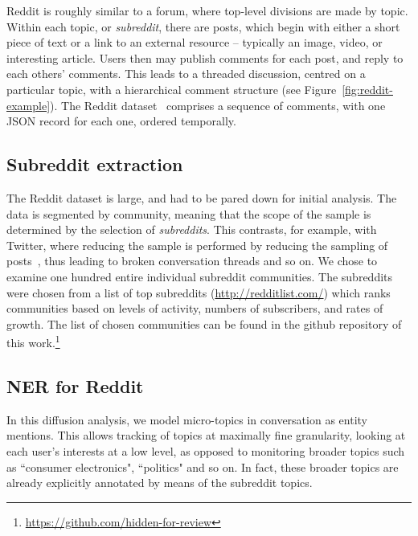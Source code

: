 \documentclass[sigconf]{acmart}
\begin{document}
Reddit is roughly similar to a forum, where top-level divisions are made by topic.
Within each topic, or {\em subreddit}, there are posts, which begin with either a short piece of text or a link to an external resource -- typically an image, video, or interesting article.
Users then may publish comments for each post, and reply to each others' comments.
This leads to a threaded discussion, centred on a particular topic, with a hierarchical comment structure (see Figure~\ref{fig:reddit-example}).
The Reddit dataset~\cite{reddit-data} comprises a sequence of comments, with one JSON record for each one, ordered temporally.


\subsection{Subreddit extraction}

The Reddit dataset is large, and had to be pared down for initial analysis.
The data is segmented by community, meaning that the scope of the sample is determined by the selection of {\em subreddits}.
This contrasts, for example, with Twitter, where reducing the sample is performed by reducing the sampling of posts~\cite{kergl2014endogenesis}, thus leading to broken conversation threads and so on.
We chose to examine one hundred entire individual subreddit communities.
The subreddits were chosen from a list of top subreddits (\url{http://redditlist.com/}) which ranks communities based on levels of activity, numbers of subscribers, and rates of growth.
The list of chosen communities can be found in the github repository of this work.\footnote{\url{https://github.com/hidden-for-review}}


\subsection{NER for Reddit}

In this diffusion analysis, we model micro-topics in conversation as entity mentions.
This allows tracking of topics at maximally fine granularity, looking at each user's interests at a low level, as opposed to monitoring broader topics such as ``consumer electronics", ``politics" and so on.
In fact, these broader topics are already explicitly annotated by means of the subreddit topics.
\end{document}
